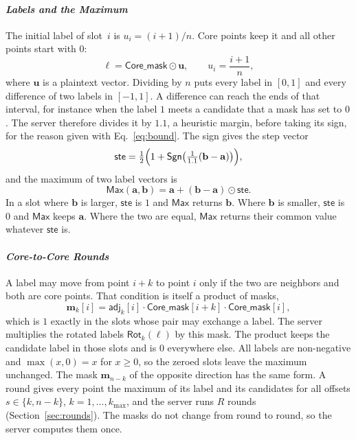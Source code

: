 \paragraph{\emph{Labels and the Maximum}}
The initial label of slot~$i$ is $u_i = (i+1)/n$. Core points keep it
and all other points start with $0$:
\begin{equation}
  \label{eq:init}
  \boldsymbol{\ell} = \mathsf{Core\_mask} \odot \mathbf{u},
  \qquad u_i = \frac{i+1}{n} ,
\end{equation}
where $\mathbf{u}$ is a plaintext vector. Dividing by $n$ puts every
label in $[0,1]$ and every difference of two labels in $[-1,1]$. A
difference can reach the ends of that interval, for instance when the
label $1$ meets a candidate that a mask has set to $0$. The server
therefore divides it by $1.1$, a heuristic margin, before taking its
sign, for the reason given with Eq.~\eqref{eq:bound}. The sign gives the step vector
\begin{equation}
  \label{eq:step}
  \mathsf{ste} = \tfrac{1}{2}\Bigl( 1 + \mathsf{Sgn}\bigl(
    \tfrac{1}{1.1} (\mathbf{b} - \mathbf{a}) \bigr) \Bigr),
\end{equation}
and the maximum of two label vectors is
\begin{equation}
  \label{eq:max}
  \mathsf{Max}(\mathbf{a}, \mathbf{b}) = \mathbf{a}
    + (\mathbf{b} - \mathbf{a}) \odot \mathsf{ste} .
\end{equation}
In a slot where $\mathbf{b}$ is larger, $\mathsf{ste}$ is $1$ and
$\mathsf{Max}$ returns $\mathbf{b}$. Where $\mathbf{b}$ is smaller,
$\mathsf{ste}$ is $0$ and $\mathsf{Max}$ keeps $\mathbf{a}$. Where the two
are equal, $\mathsf{Max}$ returns their common value whatever
$\mathsf{ste}$ is.

\paragraph{\emph{Core-to-Core Rounds}}
A label may move from point $i+k$ to point $i$ only if the two are
neighbors and both are core points. That condition is itself a product of
masks,
\begin{equation}
  \label{eq:mask}
  \mathbf{m}_k[i] = \mathsf{adj}_k[i] \cdot \mathsf{Core\_mask}[i+k]
    \cdot \mathsf{Core\_mask}[i] ,
\end{equation}
which is $1$ exactly in the slots whose pair may exchange a label. The
server multiplies the rotated labels $\mathsf{Rot}_k(\boldsymbol{\ell})$
by this mask. The product keeps the candidate label in those slots and is
$0$ everywhere else. All labels are non-negative and $\max(x,0) = x$ for
$x \ge 0$, so the zeroed slots leave the maximum unchanged. The mask
$\mathbf{m}_{n-k}$ of the opposite direction has the same form. A round
gives every point the maximum of its label and its candidates for all
offsets $s \in \{k, n-k\}$, $k = 1, \dots, k_{\max}$, and the server runs
$R$ rounds (Section~\ref{sec:rounds}). The masks do not change from round
to round, so the server computes them once.

